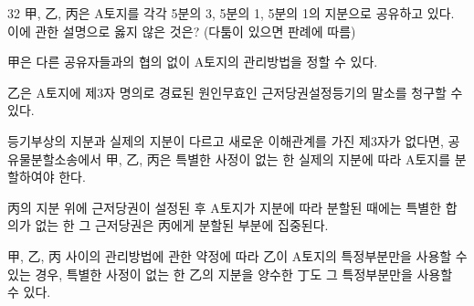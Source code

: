 \begin{question}{32}
甲, 乙, 丙은 A토지를 각각 5분의 3, 5분의 1, 5분의 1의 지분으로 공유하고 있다. 이에 관한 설명으로 옳지 않은 것은? (다툼이 있으면 판례에 따름)
\begin{choices}
  \item 甲은 다른 공유자들과의 협의 없이 A토지의 관리방법을 정할 수 있다.
  \item 乙은 A토지에 제3자 명의로 경료된 원인무효인 근저당권설정등기의 말소를 청구할 수 있다.
  \item 등기부상의 지분과 실제의 지분이 다르고 새로운 이해관계를 가진 제3자가 없다면, 공유물분할소송에서 甲, 乙, 丙은 특별한 사정이 없는 한 실제의 지분에 따라 A토지를 분할하여야 한다.
  \item 丙의 지분 위에 근저당권이 설정된 후 A토지가 지분에 따라 분할된 때에는 특별한 합의가 없는 한 그 근저당권은 丙에게 분할된 부분에 집중된다.
  \item 甲, 乙, 丙 사이의 관리방법에 관한 약정에 따라 乙이 A토지의 특정부분만을 사용할 수 있는 경우, 특별한 사정이 없는 한 乙의 지분을 양수한 丁도 그 특정부분만을 사용할 수 있다.
\end{choices}
\end{question}
